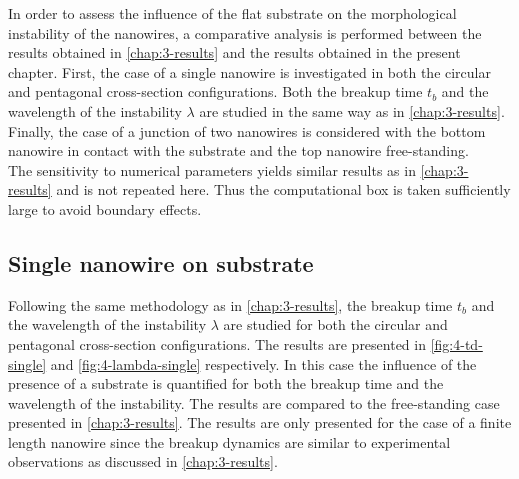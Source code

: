 In order to assess the influence of the flat substrate on the morphological instability of the nanowires, a comparative analysis is performed between the results obtained in \autoref{chap:3-results} and the results obtained in the present chapter. First, the case of a single nanowire is investigated in both the circular and pentagonal cross-section configurations. Both the breakup time $t_b$ and the wavelength of the instability $\lambda$ are studied in the same way as in \autoref{chap:3-results}. Finally, the case of a junction of two nanowires is considered with the bottom nanowire in contact with the substrate and the top nanowire free-standing.\\
The sensitivity to numerical parameters yields similar results as in \autoref{chap:3-results} and is not repeated here. Thus the computational box is taken sufficiently large to avoid boundary effects.
\subsection{Single nanowire on substrate}
Following the same methodology as in \autoref{chap:3-results}, the breakup time $t_b$ and the wavelength of the instability $\lambda$ are studied for both the circular and pentagonal cross-section configurations. The results are presented in \autoref{fig:4-td-single} and \autoref{fig:4-lambda-single} respectively. In this case the influence of the presence of a substrate is quantified for both the breakup time and the wavelength of the instability. The results are compared to the free-standing case presented in \autoref{chap:3-results}. The results are only presented for the case of a finite length nanowire since the breakup dynamics are similar to experimental observations as discussed in \autoref{chap:3-results}.

